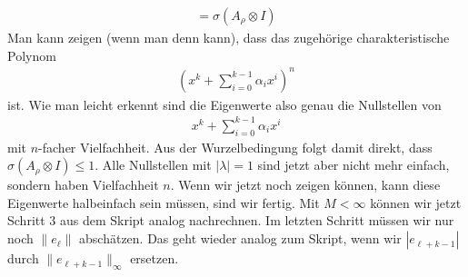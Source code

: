 \begin{solution}
\begin{align*}
  = \sigma(A_{\rho} \otimes I)
\end{align*}
Man kann zeigen (wenn man denn kann), dass das zugehörige charakteristische Polynom
\begin{align*}
  (x^k + \sum_{i = 0}^{k-1}\alpha_ix^i)^n
\end{align*}
ist. Wie man leicht erkennt sind die Eigenwerte also genau die Nullstellen von
\begin{align*}
  x^k + \sum_{i = 0}^{k-1}\alpha_ix^i
\end{align*}
mit $n$-facher Vielfachheit. Aus der Wurzelbedingung folgt damit direkt, dass
$\sigma(A_{\rho} \otimes I) \leq 1$. Alle Nullstellen mit $|\lambda| = 1$
sind jetzt aber nicht mehr einfach, sondern haben Vielfachheit $n$.
Wenn wir jetzt noch zeigen können, kann diese Eigenwerte halbeinfach sein müssen,
sind wir fertig.
Mit $M < \infty$ können wir jetzt Schritt 3 aus dem Skript analog nachrechnen.
Im letzten Schritt müssen wir nur noch $\|e_{\ell}\|$ abschätzen.
Das geht wieder analog zum Skript, wenn wir $|e_{\ell + k  - 1}|$
durch $\|e_{\ell + k  - 1}\|_{\infty}$ ersetzen.
\end{solution}
